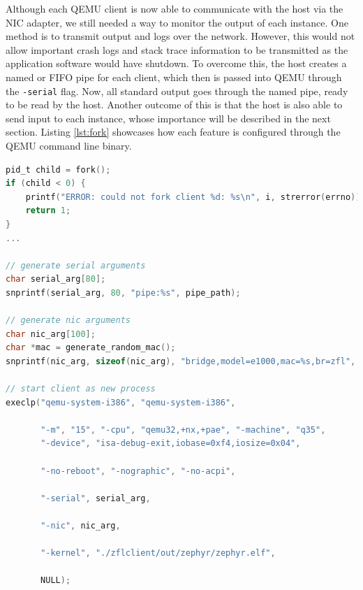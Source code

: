 \documentclass[12pt]{article}
\begin{document}
Although each QEMU client is now able to communicate with the host via the NIC adapter, we still
needed a way to monitor the output of each instance. One method is to transmit
output and logs over the network. However, this would not allow important crash logs and stack trace
information to be transmitted as the application software would have shutdown. To overcome this, the host
creates a named or FIFO pipe for each client, which then is passed into
QEMU through the \verb|-serial| flag. Now, all standard output goes through the named pipe, ready to be read
by the host. Another outcome of this is that the host is also able to send input to each
instance, whose importance will be described in the next section. Listing \ref{lst:fork} showcases
how each feature is configured through the QEMU command line binary.

\begin{lstlisting}[language=C,caption=Client forking process,label={lst:fork}]
pid_t child = fork();
if (child < 0) {
    printf("ERROR: could not fork client %d: %s\n", i, strerror(errno));
    return 1;
}
...

// generate serial arguments
char serial_arg[80];
snprintf(serial_arg, 80, "pipe:%s", pipe_path);

// generate nic arguments
char nic_arg[100];
char *mac = generate_random_mac();
snprintf(nic_arg, sizeof(nic_arg), "bridge,model=e1000,mac=%s,br=zfl", mac);

// start client as new process
execlp("qemu-system-i386", "qemu-system-i386",

       "-m", "15", "-cpu", "qemu32,+nx,+pae", "-machine", "q35",
       "-device", "isa-debug-exit,iobase=0xf4,iosize=0x04",

       "-no-reboot", "-nographic", "-no-acpi",

       "-serial", serial_arg,

       "-nic", nic_arg,

       "-kernel", "./zflclient/out/zephyr/zephyr.elf",

       NULL);
\end{lstlisting}
\end{document}
